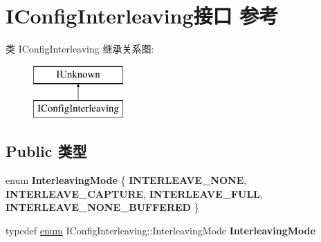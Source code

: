 \hypertarget{interface_i_config_interleaving}{}\section{I\+Config\+Interleaving接口 参考}
\label{interface_i_config_interleaving}
类 I\+Config\+Interleaving 继承关系图\+:\begin{figure}[H]
\begin{center}
\leavevmode
\includegraphics[height=2.000000cm]{interface_i_config_interleaving}
\end{center}
\end{figure}
\subsection*{Public 类型}
\begin{DoxyCompactItemize}
\item 
\mbox{\label{interface_i_config_interleaving_a498b762e81a7876bf4d3aeff26795072}} 
enum {\bfseries Interleaving\+Mode} \{ {\bfseries I\+N\+T\+E\+R\+L\+E\+A\+V\+E\+\_\+\+N\+O\+NE}, 
{\bfseries I\+N\+T\+E\+R\+L\+E\+A\+V\+E\+\_\+\+C\+A\+P\+T\+U\+RE}, 
{\bfseries I\+N\+T\+E\+R\+L\+E\+A\+V\+E\+\_\+\+F\+U\+LL}, 
{\bfseries I\+N\+T\+E\+R\+L\+E\+A\+V\+E\+\_\+\+N\+O\+N\+E\+\_\+\+B\+U\+F\+F\+E\+R\+ED}
 \}
\item 
\mbox{\label{interface_i_config_interleaving_a7f6f2a383623367e9a9f2ff8179dc522}} 
typedef \hyperlink{interfaceenum}{enum} I\+Config\+Interleaving\+::\+Interleaving\+Mode {\bfseries Interleaving\+Mode}
\end{DoxyCompactItemize}
